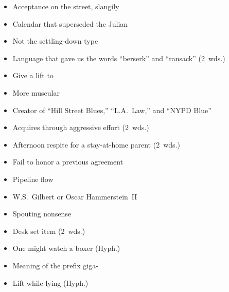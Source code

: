 {\begin{itemize}
      \item
        Acceptance on the street, slangily
      \item
        Calendar that superseded the Julian
    \end{itemize}
  \item
    \begin{itemize}
      \item
        Not the settling-down type
      \item
        Language that gave us the words ``berserk'' and ``ransack'' (2~wds.)
    \end{itemize}
  \item
    \begin{itemize}
      \item
        Give a lift to
      \item
        More muscular
    \end{itemize}
  \item
    \begin{itemize}
      \item
        Creator of ``Hill Street Blues,'' ``L.A.\ Law,'' and ``NYPD Blue''
      \item
        Acquires through aggressive effort (2~wds.)
    \end{itemize}
  \item
    \begin{itemize}
      \item
        Afternoon respite for a stay-at-home parent (2~wds.)
      \item
        Fail to honor a previous agreement
    \end{itemize}
  \item
    \begin{itemize}
      \item
        Pipeline flow
      \item
        W.S.\ Gilbert or Oscar Hammerstein~II
    \end{itemize}
}{%
  \item
    \begin{itemize}
      \item
        Spouting nonsense
      \item
        Desk set item (2~wds.)
      \item
        One might watch a boxer (Hyph.)
      \item
        Meaning of the prefix giga-
      \item
        Lift while lying (Hyph.)
    \end{itemize}
}
